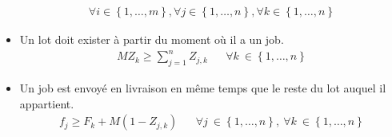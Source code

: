 \documentclass{article}
\begin{document}
\begin{itemize}
\begin{align}
                    \forall i \in\left\{1,\dotsc, m \right\},
                    \forall j \in\left\{1,\dotsc, n \right\},
                    \forall k \in\left\{1,\dotsc, n \right\}
            	\end{align}
            \item
            	Un lot doit exister à partir du moment où il a un job.
            	\begin{align}
                    MZ_k\geq\sum_{j=1}^{n}Z_{j,k} &&
                    \forall k\ \in\left\{1,\dotsc,n \right\}
            	\end{align}
            \item
        	Un job est envoyé en livraison en même temps que le reste du lot auquel il appartient.
                \begin{align}
                    f_j\geq F_k+M\left(1-Z_{j,k}\right) &&
                    \forall j\ \in\left\{1,\dotsc,n\right\},\ \forall k\ \in\left\{1,\dotsc,n\right\}
                \end{align}
        \end{itemize}
    	
    
\end{document}
